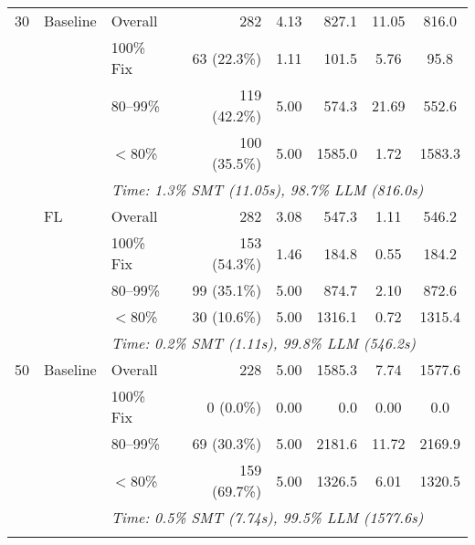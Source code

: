 \begin{table*}[t]
\begin{tabular}{lllrrrcc}
\midrule
30 & Baseline & Overall & 282 & 4.13 & 827.1 & 11.05 & 816.0 \\
 & & 100\% Fix & 63 (22.3\%) & 1.11 & 101.5 & 5.76 & 95.8 \\
 & & 80--99\% & 119 (42.2\%) & 5.00 & 574.3 & 21.69 & 552.6 \\
 & & $<$80\% & 100 (35.5\%) & 5.00 & 1585.0 & 1.72 & 1583.3 \\
 & & \multicolumn{6}{l}{\textit{Time: 1.3\% SMT (11.05s), 98.7\% LLM (816.0s)}} \\
\addlinespace
30 & FL & Overall & 282 & 3.08 & 547.3 & 1.11 & 546.2 \\
 & & 100\% Fix & 153 (54.3\%) & 1.46 & 184.8 & 0.55 & 184.2 \\
 & & 80--99\% & 99 (35.1\%) & 5.00 & 874.7 & 2.10 & 872.6 \\
 & & $<$80\% & 30 (10.6\%) & 5.00 & 1316.1 & 0.72 & 1315.4 \\
 & & \multicolumn{6}{l}{\textit{Time: 0.2\% SMT (1.11s), 99.8\% LLM (546.2s)}} \\
\midrule
50 & Baseline & Overall & 228 & 5.00 & 1585.3 & 7.74 & 1577.6 \\
 & & 100\% Fix & 0 (0.0\%) & 0.00 & 0.0 & 0.00 & 0.0 \\
 & & 80--99\% & 69 (30.3\%) & 5.00 & 2181.6 & 11.72 & 2169.9 \\
 & & $<$80\% & 159 (69.7\%) & 5.00 & 1326.5 & 6.01 & 1320.5 \\
 & & \multicolumn{6}{l}{\textit{Time: 0.5\% SMT (7.74s), 99.5\% LLM (1577.6s)}} \\
\addlinespace
\bottomrule
\end{tabular}
\end{table*}
